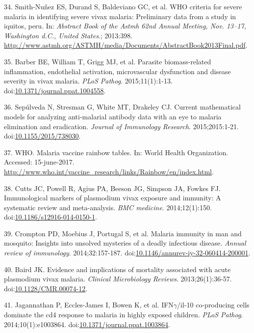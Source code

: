\documentclass[]{article}
\begin{document}
\hypertarget{ref-smith2013}{}
34. Smith-Nuñez ES, Durand S, Baldeviano GC, et al. WHO criteria for
severe malaria in identifying severe vivax malaria: Preliminary data
from a study in iquitos, peru. In: \emph{Abstract Book of the Astmh 62nd
Annual Meeting, Nov. 13--17, Washington d.C., United States}.; 2013:398.
\url{http://www.astmh.org/ASTMH/media/Documents/AbstractBook2013Final.pdf}.

\hypertarget{ref-barber2015}{}
35. Barber BE, William T, Grigg MJ, et al. Parasite biomass-related
inflammation, endothelial activation, microvascular dysfunction and
disease severity in vivax malaria. \emph{PLoS Pathog}. 2015;11(1):1-13.
doi:\href{https://doi.org/10.1371/journal.ppat.1004558}{10.1371/journal.ppat.1004558}.

\hypertarget{ref-sepulveda2015}{}
36. Sepúlveda N, Stresman G, White MT, Drakeley CJ. Current mathematical
models for analyzing anti-malarial antibody data with an eye to malaria
elimination and eradication. \emph{Journal of Immunology Research}.
2015;2015:1-21.
doi:\href{https://doi.org/10.1155/2015/738030}{10.1155/2015/738030}.

\hypertarget{ref-rainbow2016}{}
37. WHO. Malaria vaccine rainbow tables. In: World Health Organization.
Accessed: 15-june-2017.
\url{http://www.who.int/vaccine_research/links/Rainbow/en/index.html}.

\hypertarget{ref-cutts2014meta}{}
38. Cutts JC, Powell R, Agius PA, Beeson JG, Simpson JA, Fowkes FJ.
Immunological markers of plasmodium vivax exposure and immunity: A
systematic review and meta-analysis. \emph{BMC medicine}.
2014;12(1):150.
doi:\href{https://doi.org/10.1186/s12916-014-0150-1}{10.1186/s12916-014-0150-1}.

\hypertarget{ref-crompton2014rev}{}
39. Crompton PD, Moebius J, Portugal S, et al. Malaria immunity in man
and mosquito: Insights into unsolved mysteries of a deadly infectious
disease. \emph{Annual review of immunology}. 2014;32:157-187.
doi:\href{https://doi.org/10.1146/annurev-iy-32-060414-200001}{10.1146/annurev-iy-32-060414-200001}.

\hypertarget{ref-baird2013}{}
40. Baird JK. Evidence and implications of mortality associated with
acute plasmodium vivax malaria. \emph{Clinical Microbiology Reviews}.
2013;26(1):36-57.
doi:\href{https://doi.org/10.1128/CMR.00074-12}{10.1128/CMR.00074-12}.

\hypertarget{ref-jagannathan2014}{}
41. Jagannathan P, Eccles-James I, Bowen K, et al. IFN\(\gamma\)/il-10
co-producing cells dominate the cd4 response to malaria in highly
exposed children. \emph{PLoS Pathog}. 2014;10(1):e1003864.
doi:\href{https://doi.org/10.1371/journal.ppat.1003864}{10.1371/journal.ppat.1003864}.
\end{document}
